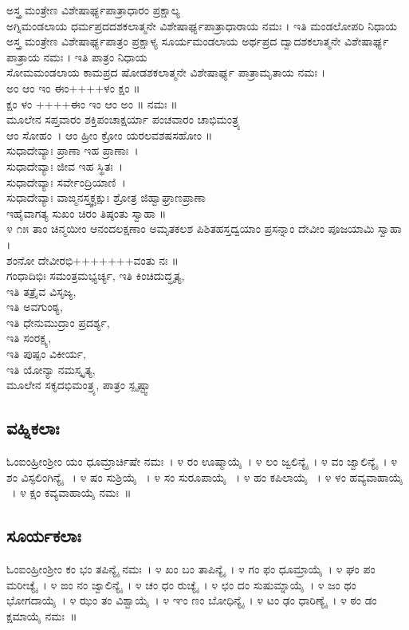 ಅಸ್ತ್ರ ಮಂತ್ರೇಣ ವಿಶೇಷಾರ್ಘ್ಯಪಾತ್ರಾಧಾರಂ ಪ್ರಕ್ಷಾಲ್ಯ\\
 ಅಗ್ನಿಮಂಡಲಾಯ ಧರ್ಮಪ್ರದದಶಕಲಾತ್ಮನೇ ವಿಶೇಷಾರ್ಘ್ಯಪಾತ್ರಾಧಾರಾಯ ನಮಃ । ಇತಿ ಮಂಡಲೋಪರಿ ನಿಧಾಯ\\
ಅಸ್ತ್ರ ಮಂತ್ರೇಣ ವಿಶೇಷಾರ್ಘ್ಯಪಾತ್ರಂ ಪ್ರಕ್ಷಾಳ್ಯ
 ಸೂರ್ಯಮಂಡಲಾಯ ಅರ್ಥಪ್ರದ ದ್ವಾದಶಕಲಾತ್ಮನೇ ವಿಶೇಷಾರ್ಘ್ಯ ಪಾತ್ರಾಯ ನಮಃ । ಇತಿ ಪಾತ್ರಂ ನಿಧಾಯ\\
 ಸೋಮಮಂಡಲಾಯ ಕಾಮಪ್ರದ ಷೋಡಶಕಲಾತ್ಮನೇ ವಿಶೇಷಾರ್ಘ್ಯ ಪಾತ್ರಾಮೃತಾಯ ನಮಃ ।\\ಅಂ ಆಂ ಇಂ ಈಂ++++ಳಂ ಕ್ಷಂ ॥\\ ಕ್ಷಂ ಳಂ ++++ಈಂ ಇಂ ಆಂ ಅಂ ॥ ನಮಃ ॥\\
ಮೂಲೇನ ಸಪ್ತವಾರಂ ಶಕ್ತಿಪಂಚಾಕ್ಷರ್ಯಾ ಪಂಚವಾರಂ ಚಾಭಿಮಂತ್ರ್ಯ\\
ಆಂ ಸೋಹಂ~। ಆಂ ಹ್ರೀಂ ಕ್ರೋಂ ಯರಲವಶಷಸಹೋಂ ॥\\
ಸುಧಾದೇವ್ಯಾಃ ಪ್ರಾಣಾ ಇಹ ಪ್ರಾಣಾಃ~।\\
ಸುಧಾದೇವ್ಯಾಃ ಜೀವ ಇಹ ಸ್ಥಿತಃ~।\\
ಸುಧಾದೇವ್ಯಾಃ ಸರ್ವೇಂದ್ರಿಯಾಣಿ~।\\
ಸುಧಾದೇವ್ಯಾಃ ವಾಙ್ಮನಸ್ತ್ವಕ್ಚಕ್ಷುಃ ಶ್ರೋತ್ರ ಜಿಹ್ವಾಘ್ರಾಣಪ್ರಾಣಾ\\
ಇಹೈವಾಗತ್ಯ ಸುಖಂ ಚಿರಂ ತಿಷ್ಠಂತು ಸ್ವಾಹಾ ॥\\
೪ ೧೫ ತಾಂ ಚಿನ್ಮಯೀಂ ಆನಂದಲಕ್ಷಣಾಂ ಅಮೃತಕಲಶ ಪಿಶಿತಹಸ್ತದ್ವಯಾಂ ಪ್ರಸನ್ನಾಂ ದೇವೀಂ ಪೂಜಯಾಮಿ ಸ್ವಾಹಾ ।\\
ಶಂನೋ ದೇವೀರಭಿ+++++++ವಂತು ನಃ ॥\\
ಗಂಧಾದಿಭಿಃ ಸಮಂತ್ರಮಭ್ಯರ್ಚ್ಯ,
 ಇತಿ ಕಿಂಚಿದುದ್ಧೃತ್ಯ,\\
 ಇತಿ ತತ್ರೈವ ವಿಸೃಜ್ಯ,\\
 ಇತಿ ಅವಗುಂಠ್ಯ,\\
 ಇತಿ ಧೇನುಮುದ್ರಾಂ ಪ್ರದರ್ಶ್ಯ,\\
 ಇತಿ ಸಂರಕ್ಷ್ಯ,\\
 ಇತಿ ಪುಷ್ಪಂ ವಿಕೀರ್ಯ,\\
 ಇತಿ ಯೋನ್ಯಾ ನಮಸ್ಕೃತ್ಯ,\\
ಮೂಲೇನ ಸಕೃದಭಿಮಂತ್ರ್ಯ, ಪಾತ್ರಂ ಸ್ಪೃಷ್ಟ್ವಾ
\subsection{ವಹ್ನಿಕಲಾಃ}ಓಂಐಂಹ್ರೀಂಶ್ರೀಂ ಯಂ ಧೂಮ್ರಾರ್ಚಿಷೇ   ನಮಃ~। ೪  ರಂ ಊಷ್ಮಾಯೈ~। ೪  ಲಂ ಜ್ವಲಿನ್ಯೈ~। ೪  ವಂ ಜ್ವಾಲಿನ್ಯೈ~। ೪  ಶಂ ವಿಸ್ಫಲಿಂಗಿನ್ಯೈ ~। ೪  ಷಂ ಸುಶ್ರಿಯೈ ~। ೪  ಸಂ ಸುರೂಪಾಯೈ ~। ೪  ಹಂ ಕಪಿಲಾಯೈ ~। ೪  ಳಂ ಹವ್ಯವಾಹಾಯೈ ~। ೪  ಕ್ಷಂ ಕವ್ಯವಾಹಾಯೈ ನಮಃ~॥
\subsection{ಸೂರ್ಯಕಲಾಃ}ಓಂಐಂಹ್ರೀಂಶ್ರೀಂ ಕಂ ಭಂ ತಪಿನ್ಯೈ ನಮಃ~। ೪ ಖಂ ಬಂ ತಾಪಿನ್ಯೈ~। ೪ ಗಂ ಫಂ ಧೂಮ್ರಾಯೈ~। ೪ ಘಂ ಪಂ ಮರೀಚ್ಯೈ~। ೪ ಙಂ ನಂ ಜ್ವಾಲಿನ್ಯೈ~। ೪ ಚಂ ಧಂ ರುಚ್ಯೈ~। ೪ ಛಂ ದಂ ಸುಷುಮ್ನಾಯೈ~। ೪ ಜಂ ಥಂ ಭೋಗದಾಯೈ~। ೪ ಝಂ ತಂ ವಿಶ್ವಾಯೈ~। ೪ ಞಂ ಣಂ ಬೋಧಿನ್ಯೈ~। ೪ ಟಂ ಢಂ ಧಾರಿಣ್ಯೈ~। ೪ ಠಂ ಡಂ ಕ್ಷಮಾಯೈ ನಮಃ~॥
